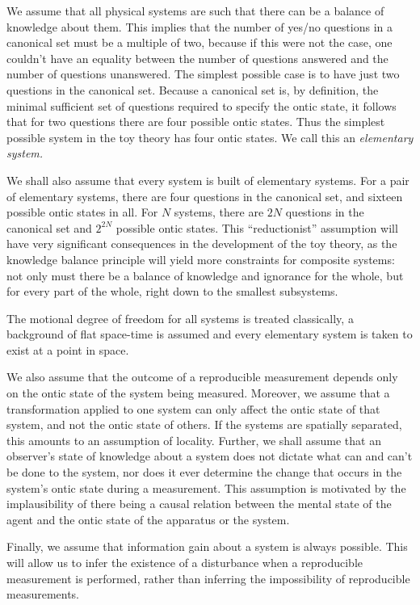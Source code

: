 \documentclass[pra,nofootinbib,showpacs,12pt]{revtex4}
\begin{document}
We assume that all physical systems are such that there can be a balance of
knowledge about them. This implies that the number of yes/no questions in a
canonical set must be a multiple of two, because if this were not the case,
one couldn't have an equality between the number of questions answered and
the number of questions unanswered. The simplest possible case is to have
just two questions in the canonical set. Because a canonical set is, by
definition, the minimal sufficient set of questions required to specify the
ontic state, it follows that for two questions there are four possible ontic
states. Thus the simplest possible system in the toy theory has four ontic
states. We call this an \emph{elementary system.}

We shall also assume that every system is built of elementary systems. For a
pair of elementary systems, there are four questions in the canonical set,
and sixteen possible ontic states in all. For $N$ systems, there are $2N$
questions in the canonical set and $2^{2N}$ possible ontic states. This
``reductionist'' assumption will have very significant consequences in the
development of the toy theory, as the knowledge balance principle will yield
more constraints for composite systems: not only must there be a balance of
knowledge and ignorance for the whole, but for every part of the whole,
right down to the smallest subsystems.

The motional degree of freedom for all systems is treated classically, a
background of flat space-time is assumed and every elementary system is
taken to exist at a point in space.

We also assume that the outcome of a reproducible measurement depends only
on the ontic state of the system being measured. Moreover, we assume that a
transformation applied to one system can only affect the ontic state of that
system, and not the ontic state of others. If the systems are spatially
separated, this amounts to an assumption of locality. Further, we shall
assume that an observer's state of knowledge about a system does not dictate
what can and can't be done to the system, nor does it ever determine the
change that occurs in the system's ontic state during a measurement. This
assumption is motivated by the implausibility of there being a causal
relation between the mental state of the agent and the ontic state of the
apparatus or the system.

Finally, we assume that information gain about a system is always possible.
This will allow us to infer the existence of a disturbance when a
reproducible measurement is performed, rather than inferring the
impossibility of reproducible measurements.
\end{document}
